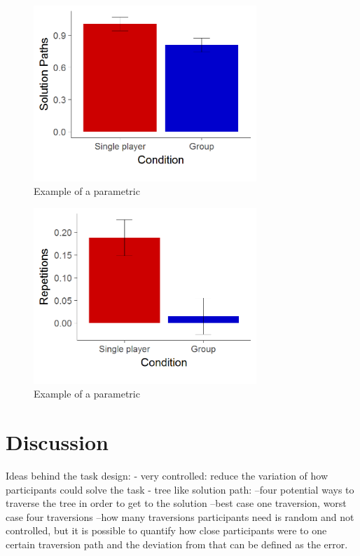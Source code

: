 \documentclass{article}
\begin{document}
\begin{figure}[h]
\centering
\includegraphics[width=0.75\textwidth]{results_solution_paths}
\caption{Example of a parametric }
\end{figure}

\begin{figure}[h]
\centering
\includegraphics[width=0.75\textwidth]{results_un_error}
\caption{Example of a parametric }
\end{figure}


\section{Discussion}
Ideas behind the task design:
- very controlled: reduce the variation of how participants could solve the task
- tree like solution path: 
--four potential ways to traverse the tree in order to get to the solution
--best case one traversion, worst case four traversions
--how many traversions participants need is random and not controlled, but it is possible to quantify how close participants were to one certain traversion path and the deviation from that can be defined as the error.



\end{document}
